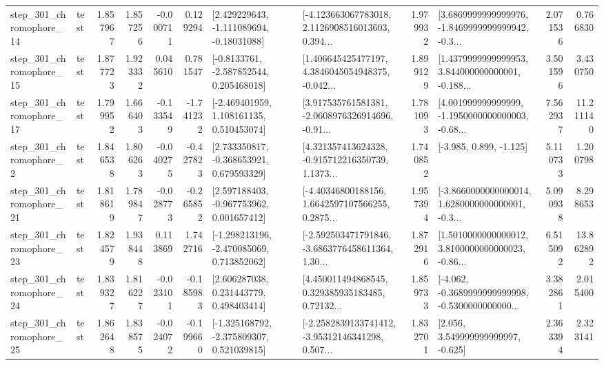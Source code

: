 \begin{tabular}{llrrrrllrlrr}
  step\_301\_chromophore\_14 &      test &      1.857967 &    1.857256 &     -0.000711 &  0.129294 &    [2.429229643, -1.111089694, -0.18031088] &  [-4.123663067783018, 2.1126908516013603, 0.394... &       1.979932 &  [3.6869999999999976, -1.8469999999999942, -0.3... &            2.071536 &          0.766830 \\
  step\_301\_chromophore\_15 &      test &      1.877723 &    1.923332 &      0.045610 &  0.781547 &     [-0.8133761, -2.587852544, 0.205468018] &  [1.406645425477197, 4.3846045054948375, -0.042... &       1.899129 &  [1.4379999999999953, 3.844000000000001, -0.188... &            3.501596 &          3.430750 \\
  step\_301\_chromophore\_17 &      test &      1.799952 &    1.666403 &     -0.133549 & -1.741232 &    [-2.469401959, 1.108161135, 0.510453074] &  [3.917535761581381, -2.0608976326914696, -0.91... &       1.781093 &  [4.001999999999999, -1.1950000000000003, -0.68... &            7.562937 &         11.211140 \\
   step\_301\_chromophore\_2 &      test &      1.846538 &    1.806263 &     -0.040275 & -0.427823 &    [2.733350817, -0.368653921, 0.679593329] &  [4.321357413624328, -0.915712216350739, 1.1373... &       1.740852 &                            [-3.985, 0.899, -1.125] &            5.110733 &          1.200798 \\
  step\_301\_chromophore\_21 &      test &      1.818619 &    1.789847 &     -0.028773 & -0.265852 &    [2.597188403, -0.967753962, 0.001657412] &  [-4.40346800188156, 1.6642597107566255, 0.2875... &       1.957394 &  [-3.8660000000000014, 1.6280000000000001, -0.3... &            5.090938 &          8.298653 \\
  step\_301\_chromophore\_23 &      test &      1.824579 &    1.938448 &      0.113869 &  1.742716 &   [-1.298213196, -2.470085069, 0.713852062] &  [-2.592503471791846, -3.6863776458611364, 1.30... &       1.872916 &  [1.5010000000000012, 3.8100000000000023, -0.86... &            6.515092 &         13.862892 \\
  step\_301\_chromophore\_24 &      test &      1.839327 &    1.816227 &     -0.023101 & -0.185983 &     [2.606287038, 0.231443779, 0.498403414] &  [4.450011494868545, 0.329385935183485, 0.72132... &       1.859733 &  [-4.062, -0.3689999999999998, -0.5300000000000... &            3.382861 &          2.015400 \\
  step\_301\_chromophore\_25 &      test &      1.862648 &    1.838575 &     -0.024072 & -0.199660 &   [-1.325168792, -2.375809307, 0.521039815] &  [-2.2582839133741412, -3.95312146341298, 0.507... &       1.832701 &                 [2.056, 3.549999999999997, -0.625] &            2.363394 &          2.323141 \\

\end{tabular}
